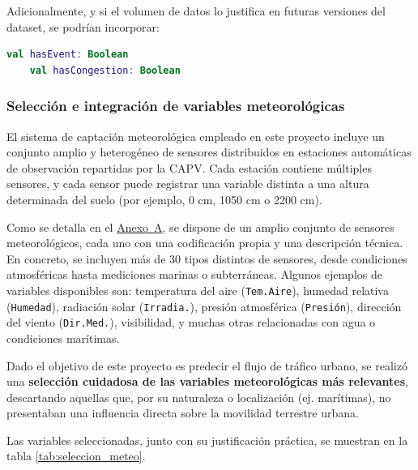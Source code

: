 Adicionalmente, y si el volumen de datos lo justifica en futuras versiones del dataset, se podrían incorporar:

\begin{lstlisting}[language=Kotlin, caption={Variables opcionales}]
	val hasEvent: Boolean
	val hasCongestion: Boolean
\end{lstlisting}

\subsubsection*{Selección e integración de variables meteorológicas}

El sistema de captación meteorológica empleado en este proyecto incluye un conjunto amplio y heterogéneo de sensores distribuidos en estaciones automáticas de observación repartidas por la CAPV. Cada estación contiene múltiples sensores, y cada sensor puede registrar una variable distinta a una altura determinada del suelo (por ejemplo, 0 cm, 1050 cm o 2200 cm). 

Como se detalla en el \hyperref[anexo:sensores]{Anexo~A}, se dispone de un amplio conjunto de sensores meteorológicos, cada uno con una codificación propia y una descripción técnica. En concreto, se incluyen más de 30 tipos distintos de sensores, desde condiciones atmosféricas hasta mediciones marinas o subterráneas. Algunos ejemplos de variables disponibles son: temperatura del aire (\texttt{Tem.Aire}), humedad relativa (\texttt{Humedad}), radiación solar (\texttt{Irradia.}), presión atmosférica (\texttt{Presión}), dirección del viento (\texttt{Dir.Med.}), visibilidad, y muchas otras relacionadas con agua o condiciones marítimas. 

Dado el objetivo de este proyecto es predecir el flujo de tráfico urbano, se realizó una \textbf{selección cuidadosa de las variables meteorológicas más relevantes}, descartando aquellas que, por su naturaleza o localización (ej. marítimas), no presentaban una influencia directa sobre la movilidad terrestre urbana.

Las variables seleccionadas, junto con su justificación práctica, se muestran en la tabla \ref{tab:seleccion_meteo}.

